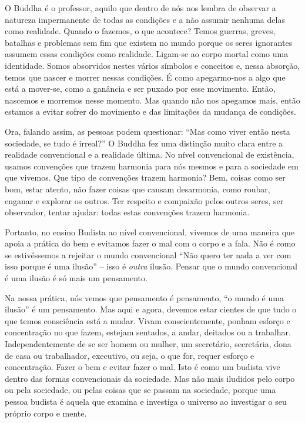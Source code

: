 O Buddha é o professor, aquilo que dentro de nós nos lembra de observar a
natureza impermanente de todas as condições e a não assumir nenhuma delas como
realidade. Quando o fazemos, o que acontece? Temos guerras, greves, batalhas e
problemas sem fim que existem no mundo porque os seres ignorantes assumem essas
condições como realidade. Ligam-se ao corpo mortal como uma identidade. Somos
absorvidos nestes vários símbolos e conceitos e, nessa absorção, temos que
nascer e morrer nessas condições. É como apegarmo-nos a algo que está a
mover-se, como a ganância e ser puxado por esse movimento. Então, nascemos e
morremos nesse momento. Mas quando não nos apegamos mais, então estamos a evitar
sofrer do movimento e das limitações da mudança de condições.

Ora, falando assim, as pessoas podem questionar: ``Mas como viver então nesta
sociedade, se tudo é irreal?'' O Buddha fez uma distinção muito clara entre a
realidade convencional e a realidade última. No nível convencional de
existência, usamos convenções que trazem harmonia para nós mesmos e para a
sociedade em que vivemos. Que tipo de convenções trazem harmonia? Bem, coisas
como ser bom, estar atento, não fazer coisas que causam desarmonia, como roubar,
enganar e explorar os outros. Ter respeito e compaixão pelos outros seres, ser
observador, tentar ajudar: todas estas convenções trazem harmonia.

Portanto, no ensino Budista ao nível convencional, vivemos de uma maneira que
apoia a prática do bem e evitamos fazer o mal com o corpo e a fala. Não é como
se estivéssemos a rejeitar o mundo convencional ``Não quero ter nada a ver com
isso porque é uma ilusão'' -- isso é \emph{outra} ilusão. Pensar que o mundo
convencional é uma ilusão é só mais um pensamento.

Na nossa prática, nós vemos que pensamento é pensamento, ``o mundo é uma
ilusão'' é um pensamento. Mas aqui e agora, devemos estar cientes de que tudo o
que temos consciência está a mudar. Vivam conscientemente, ponham esforço e
concentração no que fazem, estejam sentados, a andar, deitados ou a trabalhar.
Independentemente de se ser homem ou mulher, um secretário, secretária, dona de
casa ou trabalhador, executivo, ou seja, o que for, requer esforço e
concentração. Fazer o bem e evitar fazer o mal. Isto é como um budista vive
dentro das formas convencionais da sociedade. Mas não mais iludidos pelo corpo
ou pela sociedade, ou pelas coisas que se passam na sociedade, porque uma pessoa
budista é aquela que examina e investiga o universo ao investigar o seu próprio
corpo e mente.
